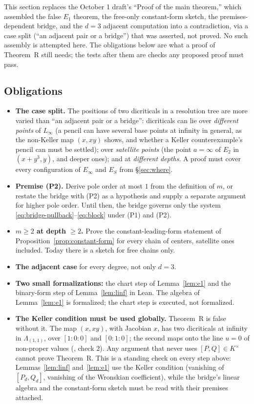 \documentclass[a4paper,11pt]{article}
\newcommand{\filename}[1]{\texttt{\seqsplit{#1}}}
\theoremstyle{plain}
\theoremstyle{definition}
\theoremstyle{remark}
\begin{document}
This section replaces the October 1 draft's ``Proof of the main theorem,'' which assembled
the false $E_1$ theorem, the free-only constant-form sketch, the premises-dependent bridge,
and the $d = 3$ adjacent computation into a contradiction, via a case split (``an adjacent
pair or a bridge'') that was asserted, not proved. No such assembly is attempted here. The
obligations below are what a proof of Theorem~R still needs; the tests after them are checks
any proposed proof must pass.

\subsection{Obligations}

\begin{itemize}[nosep]
\item[\textbf{O1.}] \textbf{The case split.} The positions of two dicriticals in a resolution
tree are more varied than ``an adjacent pair or a bridge'': dicriticals can lie over
\emph{different points} of $L_\infty$ (a pencil can have several base points at infinity in
general, as the non-Keller map $(x, xy)$ shows, and whether a Keller counterexample's pencil
can must be settled); over \emph{satellite points} (the point $a = \infty$ of $E_2$ in
$(x + y^3, y)$, and deeper ones); and at \emph{different depths}. A proof must cover every
configuration of $E_\infty$ and $E_S$ from \S\ref{sec:where}.
\item[\textbf{O2.}] \textbf{Premise (P2).} Derive pole order at most $1$ from the definition of
$m$, or restate the bridge with (P2) as a hypothesis and supply a separate argument for
higher pole order. Until then, the bridge governs only the system
\eqref{eq:bridge-pullback}--\eqref{eq:block} under (P1) and (P2).
\item[\textbf{O3.}] \textbf{$m \geq 2$ at depth $\geq 2$.} Prove the constant-leading-form
statement of Proposition~\ref{prop:constant-form} for every chain of centers, satellite ones
included. Today there is a sketch for free chains only.
\item[\textbf{O4.}] \textbf{The adjacent case} for every degree, not only $d = 3$.
\item[\textbf{O5.}] \textbf{Two small formalizations:} the chart step of Lemma~\ref{lem:e1}
and the binary-form step of Lemma~\ref{lem:linf} in Lean. The algebra of Lemma~\ref{lem:e1}
is formalized; the chart step is executed, not formalized.
\item[\textbf{O6.}] \textbf{The Keller condition must be used globally.} Theorem~R is false
without it. The map $(x, xy)$, with Jacobian $x$, has two dicriticals at infinity in
$\Lambda_{(1,1)}$, over $[1 : 0 : 0]$ and $[0 : 1 : 0]$; the second maps onto the line $u = 0$
of non-proper values (\filename{restatement\_checks.py}, check $2$). Any argument that never
uses $[P,Q] \in K^\times$ cannot prove Theorem~R. This is a standing check on every step
above: Lemmas~\ref{lem:linf} and~\ref{lem:e1} use the Keller condition (vanishing of
$[P_d, Q_d]$, vanishing of the Wronskian coefficient), while the bridge's linear algebra and
the constant-form sketch must be read with their premises attached.
\end{itemize}
\end{document}
